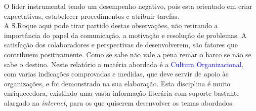 O líder instrumental tendo um desempenho negativo, pois esta orientado em criar expectativas, estabelecer procedimentos e atribuir tarefas.\\
A S.Roque aqui pode tirar partido destas observações, não retirando a importância do papel da comunicação, a motivação e resolução de problemas.
A satisfação dos colaboradores e perspectivas de desenvolverem, são fatores que contribuem positivamente. Como se sabe não vale a pena remar o barco se não se sabe o destino.
\emptyline
Neste relatório a matéria abordada é a \textcolor{blue}{Cultura Organizacional}, com varias indicações comprovadas e medidas, que deve servir de apoio às organizações, e foi demonstrado na sua elaboração. Esta disciplina é muito enriquecedora, existindo uma vasta informação literária com suporte bastante alargado na \textit{internet}, para os que quiserem desenvolver os temas abordados.
